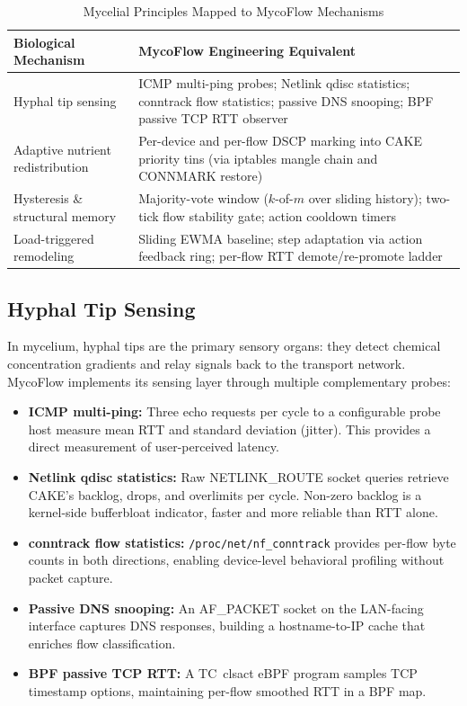 \begin{table}[h]
\caption{Mycelial Principles Mapped to MycoFlow Mechanisms}
\label{tab:bio}
\centering
\small
\begin{tabular}{p{2.8cm}p{9cm}}
\toprule
\textbf{Biological Mechanism} & \textbf{MycoFlow Engineering Equivalent} \\
\midrule
Hyphal tip sensing & ICMP multi-ping probes; Netlink qdisc statistics; conntrack flow statistics; passive DNS snooping; BPF passive TCP RTT observer \\[4pt]
Adaptive nutrient redistribution & Per-device and per-flow DSCP marking into CAKE priority tins (via iptables mangle chain and CONNMARK restore) \\[4pt]
Hysteresis \& structural memory & Majority-vote window ($k$-of-$m$ over sliding history); two-tick flow stability gate; action cooldown timers \\[4pt]
Load-triggered remodeling & Sliding EWMA baseline; step adaptation via action feedback ring; per-flow RTT demote/re-promote ladder \\
\bottomrule
\end{tabular}
\end{table}

\subsection{Hyphal Tip Sensing}

In mycelium, hyphal tips are the primary sensory organs: they detect chemical concentration gradients and relay signals back to the transport network. MycoFlow implements its sensing layer through multiple complementary probes:

\begin{itemize}
  \item \textbf{ICMP multi-ping:} Three echo requests per cycle to a configurable probe host measure mean RTT and standard deviation (jitter). This provides a direct measurement of user-perceived latency.
  \item \textbf{Netlink qdisc statistics:} Raw NETLINK\_ROUTE socket queries retrieve CAKE's backlog, drops, and overlimits per cycle. Non-zero backlog is a kernel-side bufferbloat indicator, faster and more reliable than RTT alone.
  \item \textbf{conntrack flow statistics:} \texttt{/proc/net/nf\_conntrack} provides per-flow byte counts in both directions, enabling device-level behavioral profiling without packet capture.
  \item \textbf{Passive DNS snooping:} An AF\_PACKET socket on the LAN-facing interface captures DNS responses, building a hostname-to-IP cache that enriches flow classification.
  \item \textbf{BPF passive TCP RTT:} A TC~clsact eBPF program samples TCP timestamp options, maintaining per-flow smoothed RTT in a BPF map.
\end{itemize}

